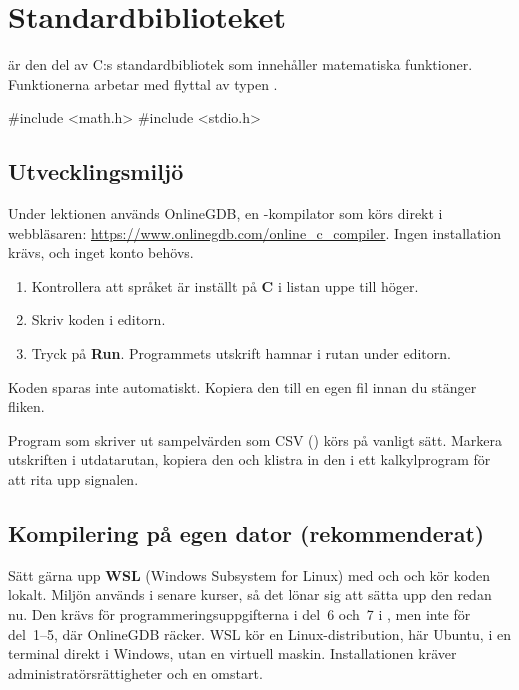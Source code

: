 
\section{Standardbiblioteket }
\label{c18:sec:mathh}
 är den del av C:s standardbibliotek som innehåller matematiska funktioner.
Funktionerna arbetar med flyttal av typen .

\begin{ccode}
#include <math.h>
#include <stdio.h>
\end{ccode}

\subsection{Utvecklingsmiljö}
\label{c18:sec:miljo}
Under lektionen används OnlineGDB, en -kompilator som körs direkt i webbläsaren:
\url{https://www.onlinegdb.com/online_c_compiler}. Ingen installation krävs, och inget konto
behövs.
\begin{enumerate}
  \item Kontrollera att språket är inställt på \textbf{C} i listan uppe till höger.
  \item Skriv koden i editorn.
  \item Tryck på \textbf{Run}. Programmets utskrift hamnar i rutan under editorn.
\end{enumerate}

\begin{aside}
\note[Obs] Koden sparas inte automatiskt. Kopiera den till en egen fil innan du stänger fliken.
\end{aside}

Program som skriver ut sampelvärden som CSV () körs på vanligt sätt. Markera
utskriften i utdatarutan, kopiera den och klistra in den i ett kalkylprogram för att rita upp
signalen.

\subsection{Kompilering på egen dator (rekommenderat)}
\label{c18:sec:egendator}
Sätt gärna upp \textbf{WSL} (Windows Subsystem for Linux) med  och  och kör
koden lokalt. Miljön används i senare kurser, så det lönar sig att sätta upp den redan nu. Den
krävs för programmeringsuppgifterna i del~6 och~7 i , men inte för
del~1--5, där OnlineGDB räcker. WSL kör en
Linux-distribution, här Ubuntu, i en terminal direkt i Windows, utan en virtuell maskin.
Installationen kräver administratörsrättigheter och en omstart.

